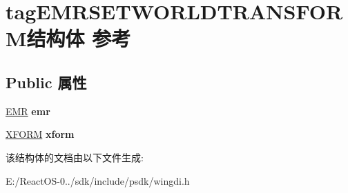 \hypertarget{structtag_e_m_r_s_e_t_w_o_r_l_d_t_r_a_n_s_f_o_r_m}{}\section{tag\+E\+M\+R\+S\+E\+T\+W\+O\+R\+L\+D\+T\+R\+A\+N\+S\+F\+O\+R\+M结构体 参考}
\label{structtag_e_m_r_s_e_t_w_o_r_l_d_t_r_a_n_s_f_o_r_m}
\subsection*{Public 属性}
\begin{DoxyCompactItemize}
\item 
\mbox{\label{structtag_e_m_r_s_e_t_w_o_r_l_d_t_r_a_n_s_f_o_r_m_a4b6c82a1ccd6571dd44f2f896f5c3b13}} 
\hyperlink{structtag_e_m_r}{E\+MR} {\bfseries emr}
\item 
\mbox{\label{structtag_e_m_r_s_e_t_w_o_r_l_d_t_r_a_n_s_f_o_r_m_adb5c7dd72e01aa565560c1bfc9e4d17c}} 
\hyperlink{struct___x_f_o_r_m}{X\+F\+O\+RM} {\bfseries xform}
\end{DoxyCompactItemize}


该结构体的文档由以下文件生成\+:\begin{DoxyCompactItemize}
\item 
E\+:/\+React\+O\+S-\/0../sdk/include/psdk/wingdi.\+h\end{DoxyCompactItemize}
